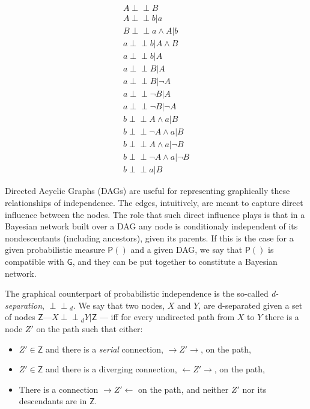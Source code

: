 \documentclass[
  10pt,
  dvipsnames,enabledeprecatedfontcommands]{scrartcl}
\newcommand{\indep}{\!\perp \!\!\! \perp\!}
\newcommand{\n}{\neg}
\newcommand{\et}{\wedge}
\newcommand{\pr}[1]{\mathsf{P}(#1)}
\begin{document}
\begin{align} A\indep B  \label{eq:indAB}\\
A \indep b \vert a   \label{eq:I1}\\
B \indep a \et A \vert b \label{eq:I2}\\
a\indep b \vert A\et B \label{eq:I3}  \\  
a\indep b \vert A \label{eq:I3a}  \\ 
a\indep B \vert A \label{eq:I4}  \\
a\indep B \vert \n A \label{eq:I4a}  \\
a\indep \n B \vert A \label{eq:I4b}  \\
a\indep \n B \vert \n A \label{eq:I4c}  \\
b\indep A \et a \vert B \label{eq:I5}  \\
b\indep \n A \et a \vert B \label{eq:I5a}  \\
b\indep A \et a \vert \n B \label{eq:I5b}  \\
b\indep \n A \et a \vert \n B \label{eq:I5c}  \\
b \indep a \vert B \label{eq:I6}
\end{align} 

Directed Acyclic Graphs (DAGs) are useful for representing graphically
these relationships of independence. The edges, intuitively, are meant
to capture direct influence between the nodes. The role that such direct
influence plays is that in a Bayesian network built over a DAG any node
is conditionaly independent of its nondescentants (including ancestors),
given its parents. If this is the case for a given probabilistic measure
\(\pr{}\) and a given DAG, we say that \(\pr{}\) is compatible with
\(\mathsf{G}\), and they can be put together to constitute a Bayesian
network.

The graphical counterpart of probabilistic independence is the so-called
\emph{d-separation}, \(\indep_d\). We say that two nodes, \(X\) and
\(Y\), are d-separated given a set of nodes
\(\mathsf{Z}\)---\(X\indep_d Y \vert \mathsf{Z}\) --- iff for every
undirected path from \(X\) to \(Y\) there is a node \(Z'\) on the path
such that either:

\begin{itemize} 
\item $Z' \in \mathsf{Z}$ and there is a \emph{serial} connection, $\rightarrow Z' \rightarrow$, on the path,
\item  $Z'\in \mathsf{Z}$ and there is a diverging connection, $\leftarrow Z' \rightarrow $, on the path,
\item There is a connection $\rightarrow Z' \leftarrow$ on the path, and neither $Z'$ nor its descendants are in $\mathsf{Z}$.
\end{itemize}
\end{document}
